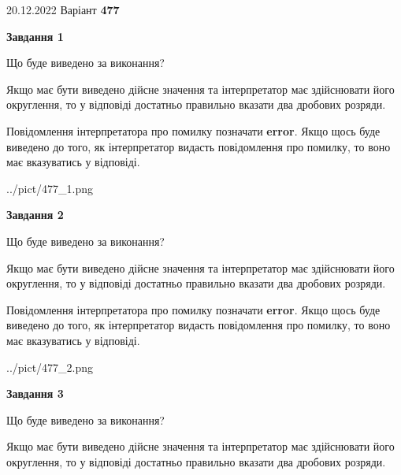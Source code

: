 \documentclass[12pt, ukrainian]{article}
\begin{document}
{20.12.2022 Варіант \No \textbf { 477 }\par}
{
\begin {Large}

{\begin {center}\textbf{Завдання 1}\end {center}}\par
Що буде виведено за виконання? \par

Якщо має бути виведено дійсне значення та інтерпретатор має здійснювати його округлення, 
то у відповіді достатньо правильно вказати два дробових розряди.

Повідомлення інтерпретатора про помилку позначати \textbf{error}.
Якщо щось буде виведено до того, як інтерпретатор видасть повідомлення про помилку, 
то воно має вказуватись у відповіді. \par

\begin{center}
	{../pict/477_1.png}
\end{center}
\newpage

{\begin {center}\textbf{Завдання 2}\end {center}}\par
Що буде виведено за виконання? \par

Якщо має бути виведено дійсне значення та інтерпретатор має здійснювати його округлення, 
то у відповіді достатньо правильно вказати два дробових розряди.

Повідомлення інтерпретатора про помилку позначати \textbf{error}.
Якщо щось буде виведено до того, як інтерпретатор видасть повідомлення про помилку, 
то воно має вказуватись у відповіді. \par

\begin{center}
	{../pict/477_2.png}
\end{center}
\newpage

{\begin {center}\textbf{Завдання 3}\end {center}}\par
Що буде виведено за виконання? \par

Якщо має бути виведено дійсне значення та інтерпретатор має здійснювати його округлення, 
то у відповіді достатньо правильно вказати два дробових розряди.


\end{Large}}
\end{document}
